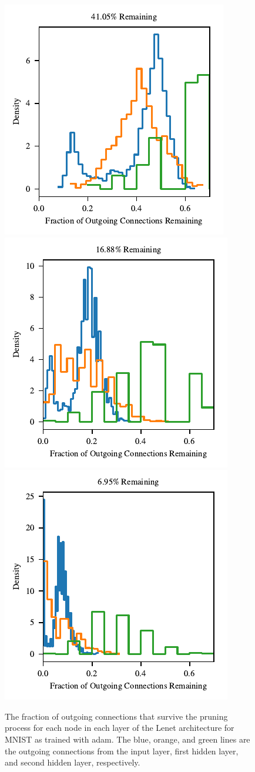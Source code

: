 \begin{figure}
\centering
\includegraphics[width=.25\textwidth]{graphs/mnist/lenet/vanilla/histogram_connectivity_outgoing4}%
\includegraphics[width=.25\textwidth]{graphs/mnist/lenet/vanilla/histogram_connectivity_outgoing8}%
\includegraphics[width=.25\textwidth]{graphs/mnist/lenet/vanilla/histogram_connectivity_outgoing12}
\caption{The fraction of outgoing connections that survive the pruning process for each node in each layer of the Lenet architecture for MNIST as trained with adam.
The blue, orange, and green lines are the outgoing connections from the input layer, first hidden layer, and second hidden layer, respectively.}
\label{fig:adam-ticket-connectivity-outgoing}
\end{figure}

